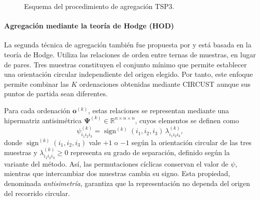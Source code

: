 \documentclass[12pt, a4paper]{report}
\begin{document}
\begin{figure}[!ht]
\caption{Esquema del procedimiento de agregación TSP3.}
\label{fig:tsp3}
\end{figure}

\paragraph{Agregación mediante la teoría de Hodge (HOD)}
\label{sec:hodge}

La segunda técnica de agregación también fue propuesta por \citet{barragan2015} y está basada en la teoría de Hodge. Utiliza las relaciones de orden entre ternas de muestras, en lugar de pares. Tres muestras constituyen el conjunto mínimo que permite establecer una orientación circular independiente del origen elegido. Por tanto, este enfoque permite combinar las \(K\) ordenaciones obtenidas mediante CIRCUST aunque sus puntos de partida sean diferentes.

Para cada ordenación \(\mathbf{o}^{(k)}\), estas relaciones se representan mediante una hipermatriz antisimétrica \(\boldsymbol{\Psi}^{(k)}\in\mathbb{R}^{n\times n\times n}\), cuyos elementos se definen como
\[
\psi^{(k)}_{i_1i_2i_3}=\operatorname{sign}^{(k)}(i_1,i_2,i_3)\,\lambda^{(k)}_{i_1i_2i_3},
\]
donde \(\operatorname{sign}^{(k)}(i_1,i_2,i_3)\) vale \(+1\) o \(-1\) según la orientación circular de las tres muestras y \(\lambda^{(k)}_{i_1i_2i_3}\geq0\) representa su grado de separación, definido según la variante del método. Así, las permutaciones cíclicas conservan el valor de \(\psi\), mientras que intercambiar dos muestras cambia su signo. Esta propiedad, denominada \emph{antisimetría}, garantiza que la representación no dependa del origen del recorrido circular.
\end{document}
